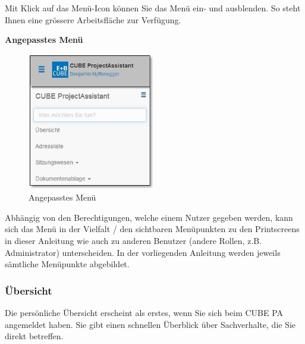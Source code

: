 \vspace{\baselineskip}

Mit Klick auf das Menü-Icon  können Sie das Menü ein- und ausblenden. So steht Ihnen eine grössere Arbeitsfläche zur Verfügung.

\vspace{6.5cm}  

\textbf{Angepasstes Menü}

\begin{figure}
\vspace{-35pt}
\includegraphics[height=60mm]{../chapters/01_Einfuehrung/pictures/1-3-1_MenuAngepasst.jpg}
\caption{Angepasstes Menü}
\end{figure}

Abhängig von den Berechtigungen, welche einem Nutzer gegeben werden, kann sich das Menü in der Vielfalt / den sichtbaren Menüpunkten zu den Printscreens in dieser Anleitung wie auch zu anderen Benutzer (andere Rollen, z.B. Administrator) unterscheiden. In der vorliegenden Anleitung werden jeweils sämtliche Menüpunkte abgebildet.

\subsubsection{Übersicht}
\label{bkm:Ref132000001}
Die persönliche Übersicht erscheint als erstes, wenn Sie sich beim CUBE PA angemeldet haben. Sie gibt einen schnellen Überblick über Sachverhalte, die Sie direkt betreffen.

